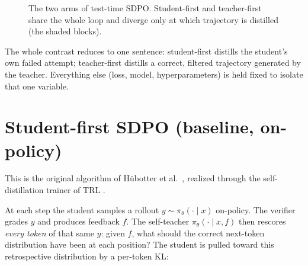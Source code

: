 \begin{figure}[H]
\centering
{}
\caption{The two arms of test-time SDPO. Student-first and teacher-first share the whole loop and diverge only at which trajectory is distilled (the shaded blocks).}
\label{fig:two-arms}
\end{figure}

The whole contrast reduces to one sentence: student-first distills the student's own failed attempt; teacher-first distills a correct, filtered trajectory generated by the teacher. Everything else (loss, model, hyperparameters) is held fixed to isolate that one variable.

\section{Student-first SDPO (baseline, on-policy)}\label{student-first-sdpo-baseline-on-policy}

This is the original algorithm of Hübotter et al.~\cite{r1}, realized through the self-distillation trainer of TRL \cite{r5}.

At each step the student samples a rollout \(y \sim \pi_\theta(\cdot \mid x)\) on-policy. The verifier grades \(y\) and produces feedback \(f\). The self-teacher \(\pi_\theta(\cdot \mid x, f)\) then rescores \emph{every token} of that same \(y\): given \(f\), what should the correct next-token distribution have been at each position? The student is pulled toward this retrospective distribution by a per-token KL:

